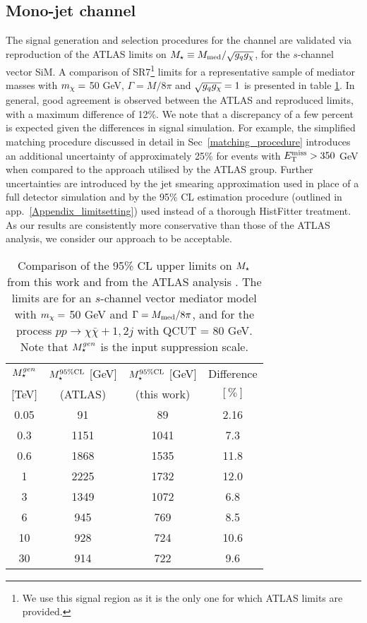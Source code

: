 \subsection{Mono-jet channel}
\label{monojet_validation}
The signal generation and selection procedures for the \monojet channel are validated via reproduction of the ATLAS limits on $M_{\star} \equiv M_{\mathrm{med}} / \sqrt{g_q g_{\chi}}$, for the $s$-channel vector SiM. A comparison of SR7\footnote{We use this signal region as it is the only one for which ATLAS limits are provided.} limits for a representative sample of mediator masses with $m_{\chi} = $ 50 GeV, $\Gamma = M/8\pi$ and $\sqrt{g_q g_{\chi}} = 1$ is presented in table \ref{M_star_limits_monojet}. In general, good agreement is observed between the ATLAS and reproduced limits, with a maximum difference of 12\%. We note that a discrepancy of a few percent is expected given the differences in signal simulation. For example, the simplified matching procedure discussed in detail in Sec~\ref{matching_procedure} introduces an additional uncertainty of approximately 25\% for events with $E_{\mathrm{T}}^{\mathrm{miss}} > 350$ GeV when compared to the approach utilised by the ATLAS \monojet group. Further uncertainties are introduced by the jet smearing approximation used in place of a full detector simulation and by the 95\% CL estimation procedure (outlined in app.~\ref{Appendix_limitsetting}) used instead of a thorough HistFitter treatment. As our results are consistently more conservative than those of the ATLAS analysis, we consider our approach to be acceptable.

\begin{table}[!htbp]
\centering
\begin{tabular}{c|c|c|c}
 \hline
 \hline
 $M_{\star}^{\tiny gen}$ & $M_{\star}^{95\%\mathrm{CL}}$ [GeV] & $M_{\star}^{95\%\mathrm{CL}}$ [GeV] & Difference \\
 $[$TeV$]$ & (ATLAS) & (this work) & $[\%]$ \\
 \hline
0.05 & 91 & 89 & 2.16 \\
0.3 & 1151 & 1041 & 7.3 \\
0.6 & 1868 & 1535 & 11.8 \\
1 & 2225 & 1732 & 12.0 \\
3 & 1349 & 1072 & 6.8 \\
6 & 945 & 769 & 8.5 \\
10 & 928 & 724 & 10.6 \\
30 & 914 & 722 & 9.6 \\
 \hline
 \hline
\end{tabular}
\caption{Comparison of the 95\% CL upper limits on $M_{\star}$ from this work and from the ATLAS \monojet analysis \cite{Aad:2015zva}. The limits are for an $s$-channel vector mediator model with $m_{\chi} = $ 50 GeV and $\Gamma = M_{\mathrm{med}}/8\pi$, and for the process $pp \rightarrow \chi \bar{\chi} + 1, 2j$ with QCUT = 80 GeV. Note that $M_{\star}^{\tiny gen}$ is the input suppression scale.}
\label{M_star_limits_monojet}
\end{table}


